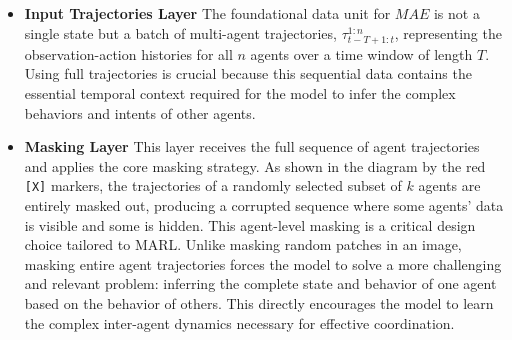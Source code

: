 \begin{description}
\begin{itemize}
    \item \textbf{Input Trajectories Layer} The foundational data unit for ${MA}E$ is not a single state but a batch of multi-agent trajectories, $\tau_{t-T+1:t}^{1:n}$, representing the observation-action histories for all $n$ agents over a time window of length $T$. Using full trajectories is crucial because this sequential data contains the essential temporal context required for the model to infer the complex behaviors and intents of other agents.
    \item \textbf{Masking Layer} This layer receives the full sequence of agent trajectories and applies the core masking strategy. As shown in the diagram by the red  \texttt{[X]} markers, the trajectories of a randomly selected subset of $k$ agents are entirely masked out, producing a corrupted sequence where some agents' data is visible and some is hidden. This agent-level masking is a critical design choice tailored to MARL. Unlike masking random patches in an image, masking entire agent trajectories forces the model to solve a more challenging and relevant problem: inferring the complete state and behavior of one agent based on the behavior of others. This directly encourages the model to learn the complex inter-agent dynamics necessary for effective coordination.

\end{itemize}
\end{description}
